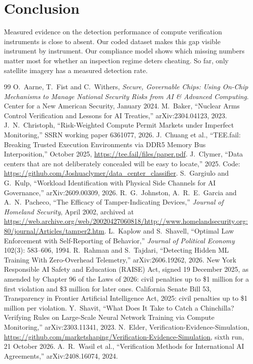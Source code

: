 \documentclass[11pt,a4paper]{article}
\newif\ifhighlight
\newcommand{\addtext}[1]{\ifhighlight{\color{newtext}#1}\else#1\fi}
\begin{document}
\section{Conclusion}
Measured evidence on the detection performance of compute verification instruments is close to absent. Our coded dataset makes this gap visible instrument by instrument. Our compliance model shows which missing numbers matter most for whether an inspection regime deters cheating. So far, only satellite imagery has a measured detection rate.

\begin{thebibliography}{99}
 O.~Aarne, T.~Fist and C.~Withers, \emph{Secure, Governable Chips: Using On-Chip Mechanisms to Manage National Security Risks from AI \& Advanced Computing}. Center for a New American Security, January 2024.
 M.~Baker, ``Nuclear Arms Control Verification and Lessons for AI Treaties,'' arXiv:2304.04123, 2023.
 J.~N.~Christoph, ``Risk-Weighted Compute Permit Markets under Imperfect Monitoring,'' SSRN working paper 6361077, 2026.
 J.~Chuang et al., ``TEE.fail: Breaking Trusted Execution Environments via DDR5 Memory Bus Interposition,'' October 2025, \url{https://tee.fail/files/paper.pdf}.
 J.~Clymer, ``Data centers that are not deliberately concealed will be easy to locate,'' 2025. Code: \url{https://github.com/Joshuaclymer/data_center_classifier}.
 S.~Gargiulo and G.~Kulp, ``Workload Identification with Physical Side Channels for AI Governance,'' arXiv:2609.00309, 2026.
 R.~G.~Johnston, A.~R.~E.~Garcia and A.~N.~Pacheco, ``The Efficacy of Tamper-Indicating Devices,'' \emph{Journal of Homeland Security}, April 2002, archived at \url{https://web.archive.org/web/20020427060818/http://www.homelandsecurity.org:80/journal/Articles/tamper2.htm}.
 \addtext{L.~Kaplow and S.~Shavell, ``Optimal Law Enforcement with Self-Reporting of Behavior,'' \emph{Journal of Political Economy} 102(3): 583--606, 1994.}
 R.~Rahman and S.~Tajdari, ``Detecting Hidden ML Training With Zero-Overhead Telemetry,'' arXiv:2606.19262, 2026.
 \addtext{New York Responsible AI Safety and Education (RAISE) Act, signed 19 December 2025, as amended by Chapter 96 of the Laws of 2026: civil penalties up to \$1 million for a first violation and \$3 million for later ones.}
 \addtext{California Senate Bill 53, Transparency in Frontier Artificial Intelligence Act, 2025: civil penalties up to \$1 million per violation.}
 Y.~Shavit, ``What Does It Take to Catch a Chinchilla? Verifying Rules on Large-Scale Neural Network Training via Compute Monitoring,'' arXiv:2303.11341, 2023.
 N.~Elder, Verification-Evidence-Simulation, \url{https://github.com/marketshaping/Verification-Evidence-Simulation}, \addtext{sixth run, 21 October 2026}.
 A.~R.~Wasil et al., ``Verification Methods for International AI Agreements,'' arXiv:2408.16074, 2024.
\end{thebibliography}
\end{document}

